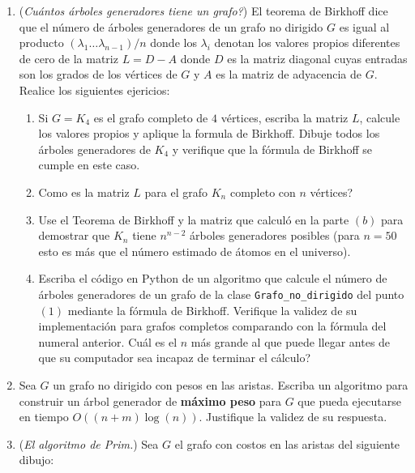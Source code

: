 \documentclass[12pt, a4paper]{article}
\begin{document}
\begin{enumerate}
\item ({\it Cuántos árboles generadores tiene un grafo?}) El teorema de Birkhoff dice que el número de árboles generadores de un grafo no dirigido $G$ es igual al producto $(\lambda_1\dots\lambda_{n-1})/n$ donde los $\lambda_i$ denotan los valores propios diferentes de cero de la matriz $L=D-A$ donde $D$ es la matriz diagonal cuyas entradas son los grados de los vértices de $G$ y $A$ es la matriz de adyacencia de $G$. Realice los siguientes ejericios:
\begin{enumerate}
\item Si $G=K_4$ es el grafo completo de $4$ vértices, escriba la matriz $L$, calcule los valores propios y aplique la formula de Birkhoff. Dibuje todos los árboles generadores de $K_4$ y verifique que la fórmula de Birkhoff se cumple en este caso.
\item Como es la matriz $L$ para el grafo $K_n$ completo con $n$ vértices?
\item Use el Teorema de Birkhoff y la matriz que calculó en la parte $(b)$ para demostrar que $K_n$ tiene $n^{n-2}$ árboles generadores posibles (para $n=50$ esto es más que el número estimado de átomos en el universo).
\item Escriba el código en Python de un algoritmo que calcule el número de árboles generadores de un grafo de la clase \verb!Grafo_no_dirigido! del punto $(1)$ mediante la fórmula de Birkhoff. Verifique la validez de su implementación para grafos completos comparando con la fórmula del numeral anterior. Cuál es el $n$ más grande al que puede llegar antes de que su computador sea incapaz de terminar el cálculo?
\end{enumerate}
\item Sea $G$ un grafo no dirigido con pesos en las aristas. Escriba un algoritmo para construir un árbol generador de {\bf máximo peso} para $G$ que pueda ejecutarse en tiempo $O((n+m)\log(n))$. Justifique la validez de su respuesta.
\newpage
\item ({\it El algoritmo de Prim.}) Sea $G$ el grafo con costos en las aristas del siguiente dibujo:
\begin{center}

\end{center}
\end{enumerate}
\end{document}
